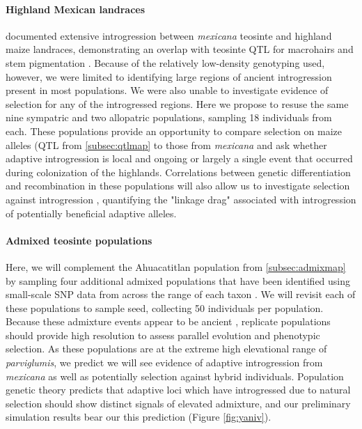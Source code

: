 \paragraph{Highland Mexican landraces}
\citet{Hufford2013} documented extensive introgression between \emph{mexicana} teosinte and highland maize landraces, demonstrating an overlap with teosinte QTL for macrohairs and stem pigmentation \citep{Lauter2004a}. Because of the relatively low-density genotyping used, however, we were limited to identifying large regions of ancient introgression present in most populations.  We were also unable to investigate evidence of selection for any of the introgressed regions.  Here we propose to resuse the same nine sympatric and two allopatric populations, sampling 18 individuals from each. These populations provide an opportunity to compare selection on maize alleles (QTL from \ref{subsec:qtlmap} to those from \emph{mexicana} and ask whether adaptive introgression is local and ongoing or largely a single event that occurred during colonization of the highlands. Correlations between genetic differentiation and recombination in these populations will also allow us to investigate selection against introgression \citep{Brandvain2013}, quantifying the "linkage drag" associated with introgression of potentially beneficial adaptive alleles.  

\paragraph{Admixed teosinte populations}
Here, we will complement the Ahuacatitlan population from \ref{subsec:admixmap} by sampling four additional admixed populations that have been identified using small-scale SNP data from across the range of each taxon \citep{vanheerwaarden2011a}.  We will revisit each of these populations to sample seed, collecting 50 individuals per population. Because these admixture events appear to be ancient \citep{Pyhajarvi2013}, replicate populations should provide high resolution to assess parallel evolution and phenotypic selection.  As these populations are at the extreme high elevational range of \emph{parviglumis}, we predict we will see evidence of adaptive introgression from \emph{mexicana} as well as potentially selection against hybrid individuals. Population genetic theory predicts that adaptive loci which have introgressed due to natural selection should show distinct signals of elevated admixture, and our preliminary simulation results bear our this prediction (Figure \ref{fig:yaniv}). 

